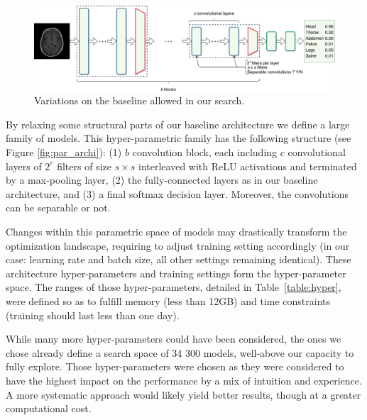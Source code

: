 \begin{figure}[htb]
	\centering
	\includegraphics[width=\linewidth]{img_hyperopt/hyperspace.pdf}
	\caption{Variations on the baseline allowed in our search.}
	\label{fig:hyperspace}
\end{figure}

By relaxing some structural parts of our baseline architecture we define a large family of models. This hyper-parametric family has the following structure (see Figure \ref{fig:par_archi}): (1) $b$ convolution block, each including $c$ convolutional layers of $2^r$ filters of size $s \times s$ interleaved with ReLU activations and terminated by a max-pooling layer, (2) the fully-connected layers as in our baseline architecture, and (3) a final softmax decision layer. Moreover, the convolutions can be separable or not.

Changes within this parametric space of models may drastically transform the optimization landscape, requiring to adjust training setting accordingly (in our case: learning rate and batch size, all other settings remaining identical). 
These architecture hyper-parameters and training settings form the hyper-parameter space. The ranges of those hyper-parameters, detailed in Table~\ref{table:hyper}, were defined so as to fulfill memory (less than 12GB) and time constraints (training should last less than one day).

While many more hyper-parameters could have been considered, the ones we chose already define a search space of 34 300 models, well-above our capacity to fully explore. Those hyper-parameters were chosen as they were considered to have the highest impact on the performance by a mix of intuition and experience. A more systematic approach would likely yield better results, though at a greater computational cost.

